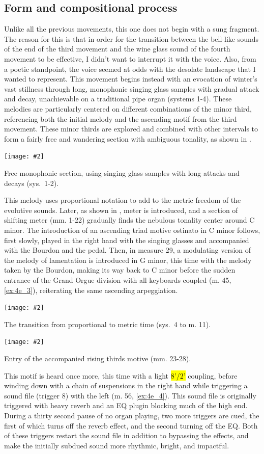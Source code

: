 \documentclass[12pt,twoside,maitrise]{dms_ks}
\newcommand{\customincludeexamples}[4][]{%
    \begin{example}[H]
        \centering
        \texttt{[image: \#2]}
        \caption{#4}
	\label{#3} 
    \end{example}
}
\theoremstyle{definition}
\begin{document}
{\subsection{Form and compositional process}

Unlike all the previous movements, this one does not begin with a sung fragment. The reason for this is that in order for the transition between the bell-like sounds of the end of the third movement and the wine glass sound of the fourth movement to be effective, I didn't want to interrupt it with the voice. Also, from a poetic standpoint, the voice seemed at odds with the desolate landscape that I wanted to represent.
This movement begins instead with an evocation of winter's vast stillness through long, monophonic singing glass samples with gradual attack and decay, unachievable on a traditional pipe organ (systems 1-4).
These melodies are particularly centered on different combinations of the minor third, referencing both the initial melody and the ascending motif from the third movement.
These minor thirds are explored and combined with other intervals to form a fairly free and wandering section with ambiguous tonality, as shown in .

\customincludeexamples[width=\textwidth]{4e_1}{ex:4e_1}{Free monophonic section, using singing glass samples with long attacks and decays (sys.~1-2).}

This melody uses proportional notation to add to the metric freedom of the evolutive sounds. 
Later, as shown in , meter is introduced, and a section of shifting meter (mm. 1-22) gradually finds the nebulous tonality center around C minor.
The introduction of an ascending triad motive ostinato in C minor follows, first slowly, played in the right hand with the singing glasses and accompanied with the Bourdon and the pedal. 
Then, in measure 29, a modulating version of the melody of lamentation is introduced in G minor, this time with the melody taken by the Bourdon, making its way back to C minor before the sudden entrance of the Grand Orgue division with all keyboards coupled (m. 45, \cref{ex:4e_3}), reiterating the same ascending arpeggiation. 

\customincludeexamples[width=\textwidth]{4e_2}{ex:4e_2}{The transition from proportional to metric time (sys.~4 to m. 11).}

\customincludeexamples[width=\textwidth]{4e_3}{ex:4e_3}{Entry of the accompanied rising thirds motive (mm. 23-28).}

This motif is heard once more, this time with a light \hl{8'/2'} coupling, before winding down with a chain of suspensions in the right hand while triggering a sound file (trigger 8) with the left (m. 56, \cref{ex:4e_4}). 
This sound file is originally triggered with heavy reverb and an EQ plugin blocking much of the high end. 
During a thirty second pause of no organ playing, two more triggers are cued, the first of which turns off the reverb effect, and the second turning off the EQ. 
Both of these triggers restart the sound file in addition to bypassing the effects, and make the initially subdued sound more rhythmic, bright, and impactful. 

}
\end{document}
